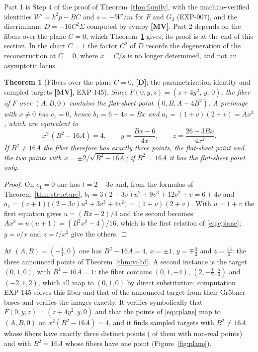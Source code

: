 \documentclass[11pt]{article}
\newtheorem{theorem}{Theorem}[section]
\theoremstyle{definition}
\theoremstyle{remark}
\newcommand{\MV}{\textbf{[MV]}}
\newcommand{\DD}{\textbf{[D]}}
\begin{document}
Part 1 is Step 4 of the proof of Theorem~\ref{thm:family}, with the machine-verified identities $W' = k^2p - BC$ and $s = -W'/m$ for $F$ and $G_3$ (EXP-007), and the discriminant $D = -16C^2\Sigma$ computed by sympy \MV. Part 2 depends on the fibers over the plane $C = 0$, which Theorem~\ref{thm:cplane} gives; its proof is at the end of this section. In the chart $C = 1$ the factor $C^2$ of $D$ records the degeneration of the reconstruction at $C = 0$, where $x = C/s$ is no longer determined, and not an asymptotic locus.

\begin{theorem}[Fibers over the plane $C = 0$, {\DD}; the parametrization identity and \numPlaneTargets{} sampled targets {\MV}, EXP-145]\label{thm:cplane}
Since $F(0,y,z) = (z + 4y^2,\, y,\, 0)$, the fiber of $F$ over $(A,B,0)$ contains the flat-sheet point $(0, B, A - 4B^2)$. A preimage with $x \neq 0$ has $c_1 = 0$, hence $b_1 = 6 + 4v = Bx$ and $a_1 = (1+v)(2+v) = Ax^2$, which are equivalent to
\begin{equation}\label{eq:cplane}
x^2\,(B^2 - 16A) = 4, \qquad y = \frac{Bx - 6}{4x}, \qquad z = \frac{26 - 3Bx}{4x^2}.
\end{equation}
If $B^2 \neq 16A$ the fiber therefore has exactly three points, the flat-sheet point and the two points with $x = \pm 2/\sqrt{B^2 - 16A}$; if $B^2 = 16A$ it has the flat-sheet point only.
\end{theorem}

\begin{proof}
On $c_1 = 0$ one has $t = 2 - 3v$ and, from the formulas of Theorem~\ref{thm:structure}, $b_1 = 3(2-3v)u^2 + 9v^3 + 12v^2 + v = 6 + 4v$ and $a_1 = (v+1)\bigl((2-3v)u^2 + 3v^3 + 4v^2\bigr) = (1+v)(2+v)$. With $u = 1 + v$ the first equation gives $u = (Bx - 2)/4$ and the second becomes $Ax^2 = u(u+1) = (B^2x^2 - 4)/16$, which is the first relation of \eqref{eq:cplane}; $y = v/x$ and $z = t/x^2$ give the others.
\end{proof}

At $(A,B) = (-\tfrac14, 0)$ one has $B^2 - 16A = 4$, $x = \pm 1$, $y = \mp\tfrac32$ and $z = \tfrac{13}{2}$: the three announced points of Theorem~\ref{thm:valid}. A second instance is the target $(0,1,0)$, with $B^2 - 16A = 1$: the fiber contains $(0, 1, -4)$, $(2, -\tfrac12, \tfrac54)$ and $(-2, 1, 2)$, which all map to $(0,1,0)$ by direct substitution; computation EXP-145 solves this fiber and that of the announced target from their Gr\"obner bases and verifies the images exactly. It verifies symbolically that $F(0,y,z) = (z + 4y^2, y, 0)$ and that the points of \eqref{eq:cplane} map to $(A,B,0)$ on $x^2(B^2 - 16A) = 4$, and it finds \numPlaneThree{} sampled targets with $B^2 \neq 16A$ whose fibers have exactly three distinct points (\numPlaneNonreal{} of them with non-real points) and \numPlaneOne{} with $B^2 = 16A$ whose fibers have one point (Figure~\ref{fig:plane}).
\end{document}
